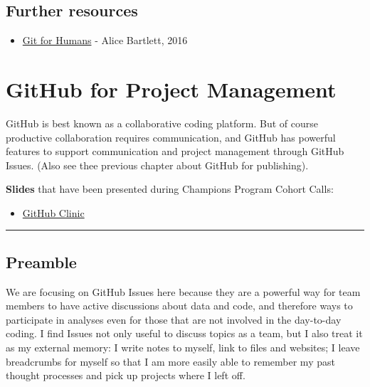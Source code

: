 \documentclass[
  letterpaper,
  DIV=11,
  numbers=noendperiod]{scrreprt}
\providecommand{\tightlist}{%
  \setlength{\itemsep}{0pt}\setlength{\parskip}{0pt}}
\begin{document}
\hypertarget{further-resources-2}{%
\section{Further resources}\label{further-resources-2}}

\begin{itemize}
\tightlist
\item
  \href{https://www.youtube.com/watch?v=eWxxfttcMts}{Git for Humans} -
  Alice Bartlett, 2016
\end{itemize}

\hypertarget{github-issues}{%
\chapter{GitHub for Project Management}\label{github-issues}}

GitHub is best known as a collaborative coding platform. But of course
productive collaboration requires communication, and GitHub has powerful
features to support communication and project management through GitHub
Issues. (Also see thee previous chapter about GitHub for publishing).

\textbf{Slides} that have been presented during Champions Program Cohort
Calls:

\begin{itemize}
\tightlist
\item
  \href{https://docs.google.com/presentation/d/1PzGAbEpNhT6CDPe1DCHf5-eVAjy-2R2D3VMHz7dY774/edit?usp=sharing}{GitHub
  Clinic}
\end{itemize}

\begin{center}\rule{0.5\linewidth}{0.5pt}\end{center}

\hypertarget{preamble-1}{%
\section{Preamble}\label{preamble-1}}

We are focusing on GitHub Issues here because they are a powerful way
for team members to have active discussions about data and code, and
therefore ways to participate in analyses even for those that are not
involved in the day-to-day coding. I find Issues not only useful to
discuss topics as a team, but I also treat it as my external memory: I
write notes to myself, link to files and websites; I leave breadcrumbs
for myself so that I am more easily able to remember my past thought
processes and pick up projects where I left off.
\end{document}
